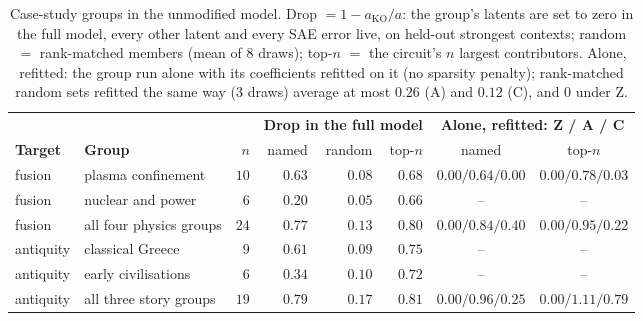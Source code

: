 \documentclass[10pt]{article}
\begin{document}
\begin{table}[!htbp]   %
\centering
\small
\setlength{\tabcolsep}{4pt}
\begin{tabular}{llrrrrcc}
\toprule
& & & \multicolumn{3}{c}{\textbf{Drop in the full model}} & \multicolumn{2}{c}{\textbf{Alone, refitted: Z / A / C}} \\
\cmidrule(lr){4-6} \cmidrule(lr){7-8}
\textbf{Target} & \textbf{Group} & $n$ & named & random & top-$n$ & named & top-$n$ \\
\midrule
fusion & plasma confinement & $10$ & $0.63$ & $0.08$ & $0.68$ & $0.00 / 0.64 / 0.00$ & $0.00 / 0.78 / 0.03$ \\
fusion & nuclear and power & $6$ & $0.20$ & $0.05$ & $0.66$ & -- & -- \\
fusion & all four physics groups & $24$ & $0.77$ & $0.13$ & $0.80$ & $0.00 / 0.84 / 0.40$ & $0.00 / 0.95 / 0.22$ \\
antiquity & classical Greece & $9$ & $0.61$ & $0.09$ & $0.75$ & -- & -- \\
antiquity & early civilisations & $6$ & $0.34$ & $0.10$ & $0.72$ & -- & -- \\
antiquity & all three story groups & $19$ & $0.79$ & $0.17$ & $0.81$ & $0.00 / 0.96 / 0.25$ & $0.00 / 1.11 / 0.79$ \\
\bottomrule
\end{tabular}
\caption{Case-study groups in the unmodified model.
Drop $= 1 - a_{\mathrm{KO}} / a$: the group's latents are set to zero in the full model, every other latent and every SAE error live, on held-out strongest contexts; random $=$ rank-matched members (mean of $8$ draws); top-$n$ $=$ the circuit's $n$ largest contributors.
Alone, refitted: the group run alone with its coefficients refitted on it (no sparsity penalty); rank-matched random sets refitted the same way ($3$ draws) average at most $0.26$ (A) and $0.12$ (C), and $0$ under Z.}
\label{tab:case-ko-full}
\end{table}
\end{document}
